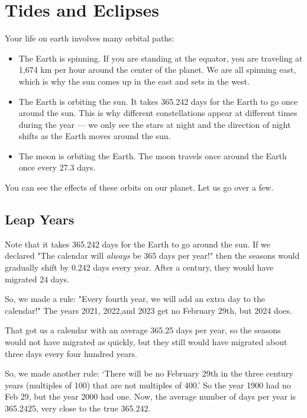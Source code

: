 \chapter{Tides and Eclipses}
Your life on earth involves many orbital paths:
\begin{itemize}

\item The Earth is spinning.  If you are standing at the equator,  you are traveling at 1,674 km per hour around the center of the planet.  We are all spinning east,  which is why the sun comes up in the east and sets in the west.

\item  The Earth is orbiting the sun. It takes 365.242 days for the Earth to go once around the sun.  This is why different constellations appear at different times during the year --- we only see the stars at night and the direction of night shifts as the Earth moves around the sun.  

\item The moon is orbiting the Earth. The moon travels once around the Earth once every 27.3 days.  

\end{itemize}

You can see the effects of these orbits on our planet. Let us go over a few.

\section{Leap Years}



Note that it takes 365.242 days for the Earth to go around the sun.  If we declared "The calendar will \emph{always} be 365 days per year!"  then the seasons would gradually shift by 0.242 days every year.  After a century,  they would have migrated 24 days.

So, we made a rule: "Every fourth year,  we will add an extra day to the calendar!"  The years 2021, 2022,and 2023 get no February 29th, but 2024 does.

That got us a calendar with an average 365.25 days per year, so the seasons would not have migrated as quickly,  but they still would have migrated about three days every four hundred years.

So, we made another rule: `There will be no February 29th in the three century years (multiples of 100) that are not multiples of 400.' So the year 1900 had no Feb 29,  but the year 2000 had one. Now, the average number of days per year is 365.2425, very close to the
true 365.242.

